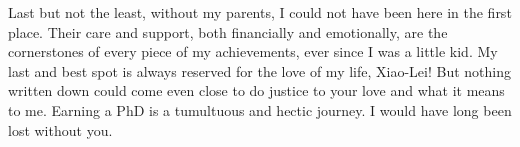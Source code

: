 Last but not the least, without my parents, I could not have been here in the first place. Their care and
support, both financially and emotionally, are the cornerstones of every piece of my achievements, ever since I
was a little kid.
My last and best spot is always reserved for the love of my life, Xiao-Lei!
But nothing written down could come even close to do justice to your love and what it means to me.
Earning a PhD is a tumultuous and hectic journey.
I would have long been lost without you.

